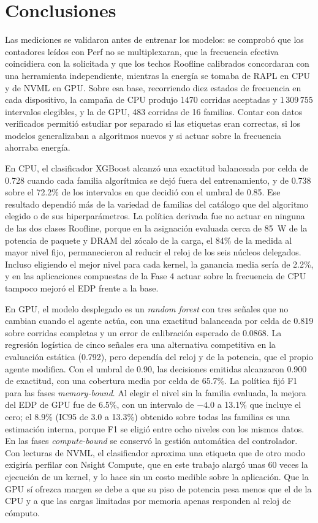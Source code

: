 \chapter{Conclusiones}

Las mediciones se validaron antes de entrenar los modelos: se comprobó que los contadores leídos con Perf no se multiplexaran, que la frecuencia efectiva coincidiera con la solicitada y que los techos Roofline calibrados concordaran con una herramienta independiente, mientras la energía se tomaba de RAPL en CPU y de NVML en GPU. Sobre esa base, recorriendo diez estados de frecuencia en cada dispositivo, la campaña de CPU produjo 1470 corridas aceptadas y 1\,309\,755 intervalos elegibles, y la de GPU, 483 corridas de 16 familias. Contar con datos verificados permitió estudiar por separado si las etiquetas eran correctas, si los modelos generalizaban a algoritmos nuevos y si actuar sobre la frecuencia ahorraba energía.

En CPU, el clasificador XGBoost alcanzó una exactitud balanceada por celda de 0.728 cuando cada familia algorítmica se dejó fuera del entrenamiento, y de 0.738 sobre el 72.2\% de los intervalos en que decidió con el umbral de 0.85. Ese resultado dependió más de la variedad de familias del catálogo que del algoritmo elegido o de sus hiperparámetros. La política derivada fue no actuar en ninguna de las dos clases Roofline, porque en la asignación evaluada cerca de 85~W de la potencia de paquete y DRAM del zócalo de la carga, el 84\% de la medida al mayor nivel fijo, permanecieron al reducir el reloj de los seis núcleos delegados. Incluso eligiendo el mejor nivel para cada kernel, la ganancia media sería de 2.2\%, y en las aplicaciones compuestas de la Fase 4 actuar sobre la frecuencia de CPU tampoco mejoró el EDP frente a la base.

En GPU, el modelo desplegado es un \textit{random forest} con tres señales que no cambian cuando el agente actúa, con una exactitud balanceada por celda de 0.819 sobre corridas completas y un error de calibración esperado de 0.0868. La regresión logística de cinco señales era una alternativa competitiva en la evaluación estática (0.792), pero dependía del reloj y de la potencia, que el propio agente modifica. Con el umbral de 0.90, las decisiones emitidas alcanzaron 0.900 de exactitud, con una cobertura media por celda de 65.7\%. La política fijó F1 para las fases \textit{memory-bound}. Al elegir el nivel sin la familia evaluada, la mejora del EDP de GPU fue de 6.5\%, con un intervalo de $-4.0$ a 13.1\% que incluye el cero; el 8.9\% (IC95 de 3.0 a 13.3\%) obtenido sobre todas las familias es una estimación interna, porque F1 se eligió entre ocho niveles con los mismos datos. En las fases \textit{compute-bound} se conservó la gestión automática del controlador. Con lecturas de NVML, el clasificador aproxima una etiqueta que de otro modo exigiría perfilar con Nsight Compute, que en este trabajo alargó unas 60 veces la ejecución de un kernel, y lo hace sin un costo medible sobre la aplicación. Que la GPU sí ofrezca margen se debe a que su piso de potencia pesa menos que el de la CPU y a que las cargas limitadas por memoria apenas responden al reloj de cómputo.

